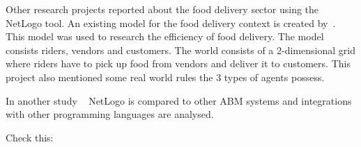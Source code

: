 Other research projects reported about the food delivery sector using the NetLogo tool.
An existing model for the food delivery context is created by~\cite{ismail2024software}.
This model was used to research the efficiency of food delivery.
The model consists riders, vendors and customers.
The world consists of a 2-dimensional grid where riders have to pick up food from vendors and deliver it to customers.
This project also mentioned some real world rules the 3 types of agents possess.

In another study ~\cite{antelmi2024reliable} NetLogo is compared to other ABM systems and integrations with other programming languages are analysed.


Check this: ~\cite{cincotti2022we}


